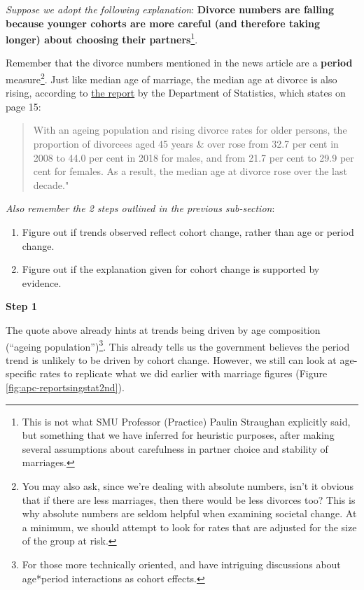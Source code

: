 \documentclass[openany]{book}
\providecommand{\tightlist}{%
  \setlength{\itemsep}{0pt}\setlength{\parskip}{0pt}}
\let\rmarkdownfootnote\footnote%
\def\footnote{\protect\rmarkdownfootnote}
\begin{document}
\emph{Suppose we adopt the following explanation}: \textbf{Divorce
numbers are falling because younger cohorts are more careful (and
therefore taking longer) about choosing their partners}\footnote{This is
  not what SMU Professor (Practice) Paulin Straughan explicitly said,
  but something that we have inferred for heuristic purposes, after
  making several assumptions about carefulness in partner choice and
  stability of marriages.}.

Remember that the divorce numbers mentioned in the news article are a
\textbf{period} measure\footnote{You may also ask, since we're dealing
  with absolute numbers, isn't it obvious that if there are less
  marriages, then there would be less divorces too? This is why absolute
  numbers are seldom helpful when examining societal change. At a
  minimum, we should attempt to look for rates that are adjusted for the
  size of the group at risk.}. Just like median age of marriage, the
median age at divorce is also rising, according to
\href{https://www.singstat.gov.sg/-/media/files/publications/population/smd2018.pdf}{the
report} by the Department of Statistics, which states on page 15:

\begin{quote}
With an ageing population and rising divorce rates for older persons,
the proportion of divorcees aged 45 years \& over rose from 32.7 per
cent in 2008 to 44.0 per cent in 2018 for males, and from 21.7 per cent
to 29.9 per cent for females. As a result, the median age at divorce
rose over the last decade."
\end{quote}

\emph{Also remember the 2 steps outlined in the previous sub-section}:

\begin{enumerate}
\def\labelenumi{\arabic{enumi}.}
\tightlist
\item
  Figure out if trends observed reflect cohort change, rather than age
  or period change.
\item
  Figure out if the explanation given for cohort change is supported by
  evidence.
\end{enumerate}

\textbf{Step 1}

The quote above already hints at trends being driven by age composition
(``ageing population'')\footnote{For those more technically oriented,
  \citet{martin_comment:_2009} and
  \citet{luo_age-period-cohort-interaction_2020} have intriguing
  discussions about age*period interactions as cohort effects.}. This
already tells us the government believes the period trend is unlikely to
be driven by cohort change. However, we still can look at age-specific
rates to replicate what we did earlier with marriage figures (Figure
\ref{fig:apc-reportsingstat2nd}).
\end{document}
